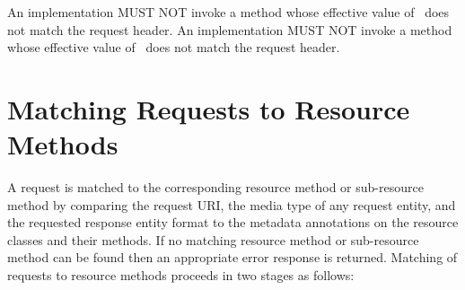 An implementation MUST NOT invoke a method whose effective value of \ProduceMime\ does not match the request  header. An implementation MUST NOT invoke a method whose effective value of \ConsumeMime\ does not match the request  header.

\section{Matching Requests to Resource Methods}
\label{mapping_requests_to_java_methods}

A request is matched to the corresponding resource method or sub-resource method by comparing the request URI, the media type of any request entity, and the requested response entity format to the metadata annotations on the resource classes and their methods. If no matching resource method or sub-resource method can be found then an appropriate error response is returned. Matching of requests to resource methods proceeds in two stages as follows:

